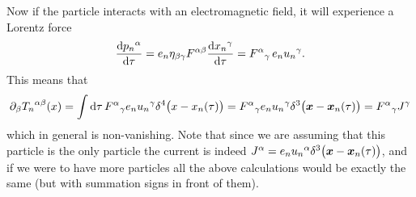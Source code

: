 \documentclass[11pt,a4paper, 
swedish, english %
]{article}
\begin{document}
Now if the particle interacts with an electromagnetic field, it will
experience a Lorentz force
\begin{equation}
\dv{{p_n}^\alpha}{\tau}=e_n\eta_{\beta\gamma}F^{\alpha\beta}
\dv{{x_n}^\gamma}{\tau}={F^{\alpha}}_\gamma \,e_n{u_n}^\gamma.
\end{equation}
This means that
\begin{equation}\label{eq2:pdvT}
\pd_\beta{T_n}^{\alpha\beta}(x)=\int\rd\tau\,{F^{\alpha}}_\gamma e_n{u_n}^\gamma
\delta^4\big(x-x_n(\tau)\big)
={F^{\alpha}}_\gamma e_n{u_n}^\gamma
\delta^3\big(\vb*x-\vb*x_n(\tau)\big)
={F^{\alpha}}_\gamma J^\gamma
\end{equation}
which in general is non-vanishing. Note that since we are assuming
that this particle is the only particle the current is indeed
$J^\alpha=e_n{u_n}^\alpha\delta^3\big(\vb*x-\vb*x_n(\tau)\big)$, and
if we were to have more particles all the above calculations would be
exactly the same (but with summation signs in front of them). 
\end{document}
